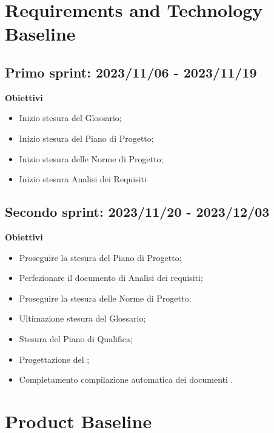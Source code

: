 \section{Requirements and Technology Baseline}
\subsection{Primo sprint: 2023/11/06 - 2023/11/19}
\textbf{Obiettivi}
\begin{itemize}
    \item Inizio stesura del Glossario;
    \item Inizio stesura del Piano di Progetto;
    \item Inizio stesura delle Norme di Progetto;
    \item Inizio stesura Analisi dei Requisiti
\end{itemize}

\subsection{Secondo sprint: 2023/11/20 - 2023/12/03}
\textbf{Obiettivi}
\begin{itemize}
    \item Proseguire la stesura del Piano di Progetto;
    \item Perfezionare il documento di Analisi dei requisiti;
    \item Proseguire la stesura delle Norme di Progetto;
    \item Ultimazione stesura del Glossario;
    \item Stesura del Piano di Qualifica;
    \item Progettazione del ;
    \item Completamento compilazione automatica dei documenti \ccgloss{\LaTeX}.
\end{itemize}

\section{Product Baseline}


\newpage
